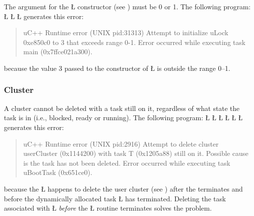 \documentclass[openright,twoside]{report}
\begin{document}
The argument for the \LGinlinetrue\LGbegin\lgrinde\L{}\endlgrinde\LGend{} constructor (see ) must be 0 or 1.
The following program:
\LGinlinefalse\LGbegin\lgrinde
\L{}
\L{\LB{}}
\L{\LB{\}}}
\endlgrinde\LGend
generates this error:
\begin{quote}
\BGfont
uC++ Runtime error (UNIX pid:31313) Attempt to initialize uLock 0xe850c0 to 3 that exceeds range 0-1.
Error occurred while executing task main (0x7ffce021a300).
\end{quote}
because the value 3 passed to the constructor of \LGinlinetrue\LGbegin\lgrinde\L{}\endlgrinde\LGend{} is outside the range 0--1.


\subsubsection{Cluster}

A cluster cannot be deleted with a task still on it, regardless of what state the task is in (i.e., blocked, ready or running).
The following program:
\LGinlinefalse\LGbegin\lgrinde
\L{}
\L{\LB{}}
\L{\LB{\};}}
\L{}
\L{\LB{}}
\L{\LB{\}}}
\endlgrinde\LGend
generates this error:
\begin{quote}
\BGfont
uC++ Runtime error (UNIX pid:2916) Attempt to delete cluster userCluster (0x1144200) with task T (0x1205a88) still on it.
Possible cause is the task has not been deleted.
Error occurred while executing task uBootTask (0x651ce0).
\end{quote}
because the \LGinlinetrue\LGbegin\lgrinde\L{}\endlgrinde\LGend{} happens to delete the user cluster (see ) after the  terminates and before the dynamically allocated task \LGinlinetrue\LGbegin\lgrinde\L{}\endlgrinde\LGend{} has terminated.
Deleting the task associated with \LGinlinetrue\LGbegin\lgrinde\L{}\endlgrinde\LGend{} \emph{before} the \LGinlinetrue\LGbegin\lgrinde\L{}\endlgrinde\LGend{} routine terminates solves the problem.
\end{document}
